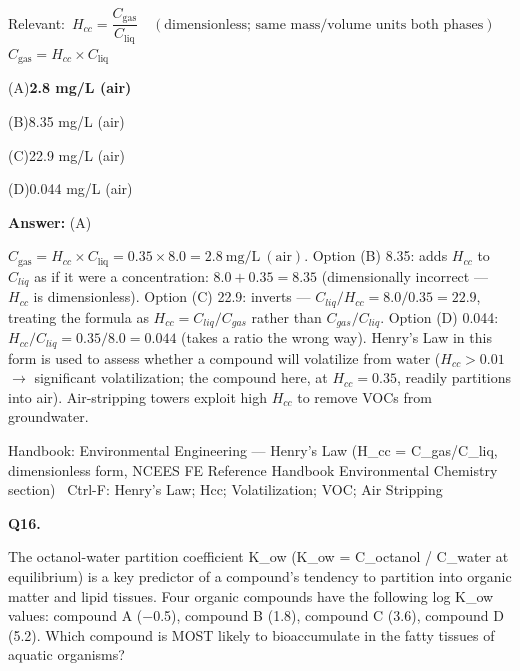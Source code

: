 \documentclass[11pt]{article}
\newcommand{\correct}[1]{\textbf{#1}\;{\color{accent}$\checkmark$}}
\newcommand{\optline}[2]{\par\noindent\hspace{1.2em}(#1)\hspace{0.6em}#2}
\begin{document}
{\small\color{soft}Relevant:}\ $H_{cc} = \dfrac{C_{\mathrm{gas}}}{C_{\mathrm{liq}}}\quad(\text{dimensionless; same mass/volume units both phases})$ \quad $C_{\mathrm{gas}} = H_{cc}\times C_{\mathrm{liq}}$\par\vspace{3pt}
\optline{A}{\correct{2.8 mg/L (air)}}
\optline{B}{8.35 mg/L (air)}
\optline{C}{22.9 mg/L (air)}
\optline{D}{0.044 mg/L (air)}
\par\vspace{3pt}
\vspace{2pt}\par\noindent\colorbox{boxbg}{\parbox{\dimexpr\linewidth-2\fboxsep\relax}{%
\vspace{2pt}\textbf{Answer:} (A)\par\vspace{2pt}
{\small $C_{\mathrm{gas}} = H_{cc}\times C_{\mathrm{liq}} = 0.35\times8.0 = 2.8\ \mathrm{mg/L\ (air)}$. Option (B) 8.35: adds $H_{cc}$ to $C_{liq}$ as if it were a concentration: $8.0 + 0.35 = 8.35$ (dimensionally incorrect --- $H_{cc}$ is dimensionless). Option (C) 22.9: inverts --- $C_{liq}/H_{cc} = 8.0/0.35 = 22.9$, treating the formula as $H_{cc} = C_{liq}/C_{gas}$ rather than $C_{gas}/C_{liq}$. Option (D) 0.044: $H_{cc}/C_{liq} = 0.35/8.0 = 0.044$ (takes a ratio the wrong way). Henry's Law in this form is used to assess whether a compound will volatilize from water ($H_{cc} > 0.01$ $\rightarrow$ significant volatilization; the compound here, at $H_{cc} = 0.35$, readily partitions into air). Air-stripping towers exploit high $H_{cc}$ to remove VOCs from groundwater.}\par\vspace{2pt}
{\footnotesize\color{soft}Handbook: Environmental Engineering --- Henry's Law (H\_cc = C\_gas/C\_liq, dimensionless form, NCEES FE Reference Handbook Environmental Chemistry section) \textbullet\ Ctrl-F: Henry's Law; Hcc; Volatilization; VOC; Air Stripping}\vspace{2pt}
}}
\vspace{9pt}
\filbreak
\textbf{\color{accent}Q16.}\par\vspace{2pt}
The octanol-water partition coefficient K\_ow (K\_ow = C\_octanol / C\_water at equilibrium) is a key predictor of a compound's tendency to partition into organic matter and lipid tissues. Four organic compounds have the following log K\_ow values: compound A ($-$0.5), compound B (1.8), compound C (3.6), compound D (5.2). Which compound is MOST likely to bioaccumulate in the fatty tissues of aquatic organisms?\par\vspace{3pt}
\end{document}
